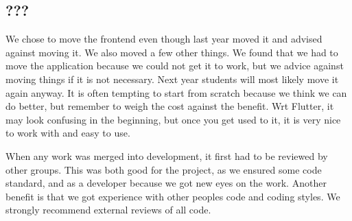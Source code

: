 \subsection{???}
We chose to move the frontend even though last year moved it and advised against moving it. We also moved a few other things. We found that we had to move the application because we could not get it to work, but we advice against moving things if it is not necessary. Next year students will most likely move it again anyway. It is often tempting to start from scratch because we think we can do better, but remember to weigh the cost against the benefit. Wrt Flutter, it may look confusing in the beginning, but once you get used to it, it is very nice to work with and easy to use.

When any work was merged into development, it first had to be reviewed by other groups. This was both good for the project, as we ensured some code standard, and as a developer because we got new eyes on the work. Another benefit is that we got experience with other peoples code and coding styles. We strongly recommend external reviews of all code.